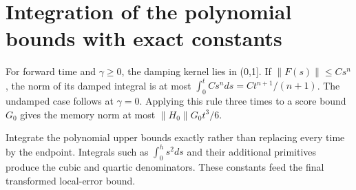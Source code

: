 \documentclass[11pt,a4paper]{article}
\begin{document}
\section{\texorpdfstring{Integration of the polynomial bounds with exact constants}{Integration of the polynomial bounds with exact constants}}


For forward time and \(\gamma \ge 0\), the damping kernel lies in (0,1]. If \(\|F(s)\|\le Cs^{n}\), the norm of its damped integral is at most \(\int _{0}^{t}Cs^{n}ds=Ct^{n+1}/(n+1)\). The undamped case follows at \(\gamma =0\). Applying this rule three times to a score bound \(G_{0}\) gives the memory norm at most \(\|H_{0}\|G_{0}t^{3}/6\).



Integrate the polynomial upper bounds exactly rather than replacing every time by the endpoint. Integrals such as \(\int_0^h s^2ds\) and their additional primitives produce the cubic and quartic denominators. These constants feed the final transformed local-error bound.
\end{document}

